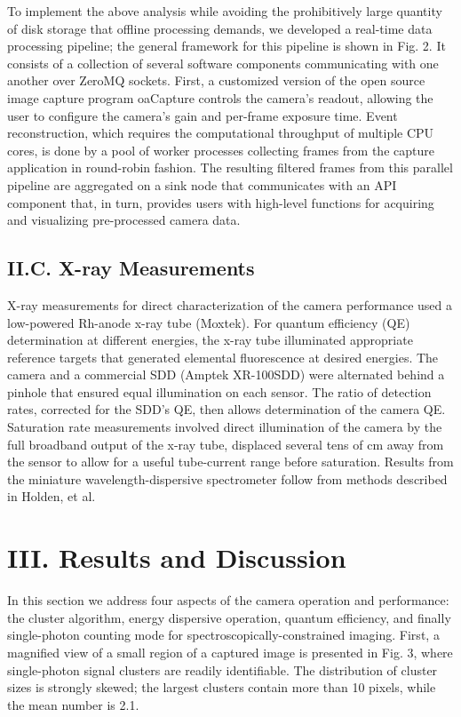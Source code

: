 To implement the above analysis while avoiding the prohibitively large
quantity of disk storage that offline processing demands, we developed a
real-time data processing pipeline; the general framework for this
pipeline is shown in Fig. 2. It consists of a collection of several
software components communicating with one another over ZeroMQ sockets.
First, a customized version of the open source image capture program
oaCapture controls the camera's readout,\cite{oacapture} allowing the
user to configure the camera's gain and per-frame exposure time. Event
reconstruction, which requires the computational throughput of multiple
CPU cores, is done by a pool of worker processes collecting frames from
the capture application in round-robin fashion. The resulting filtered
frames from this parallel pipeline are aggregated on a sink node that
communicates with an API component that, in turn, provides users with
high-level functions for acquiring and visualizing pre-processed camera
data.

\FloatBarrier

\subsection{II.C. X-ray Measurements}

X-ray measurements for direct characterization of the camera performance
used a low-powered Rh-anode x-ray tube (Moxtek). For quantum efficiency
(QE) determination at different energies, the x-ray tube illuminated
appropriate reference targets that generated elemental fluorescence at
desired energies. The camera and a commercial SDD (Amptek XR-100SDD)
were alternated behind a pinhole that ensured equal illumination on each
sensor. The ratio of detection rates, corrected for the SDD's QE, then
allows determination of the camera QE. Saturation rate measurements
involved direct illumination of the camera by the full broadband output
of the x-ray tube, displaced several tens of cm away from the sensor to
allow for a useful tube-current range before saturation. Results from
the miniature wavelength-dispersive spectrometer follow from methods
described in Holden, et al. \cite{holden2017compact}

\section{III. Results and Discussion}

In this section we address four aspects of the camera operation and
performance: the cluster algorithm, energy dispersive operation, quantum
efficiency, and finally single-photon counting mode for
spectroscopically-constrained imaging. First, a magnified view of a
small region of a captured image is presented in Fig. 3, where
single-photon signal clusters are readily identifiable. The distribution
of cluster sizes is strongly skewed; the largest clusters contain more
than 10 pixels, while the mean number is 2.1.

